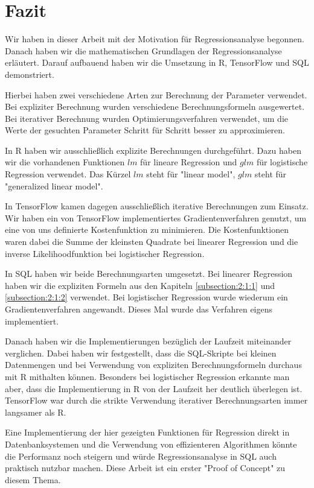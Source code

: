 \chapter{Fazit}
\label{chapter:6}

Wir haben in dieser Arbeit mit der Motivation für Regressionsanalyse begonnen. Danach haben wir die mathematischen Grundlagen der Regressionsanalyse erläutert. Darauf aufbauend haben wir die Umsetzung in R, TensorFlow und SQL demonstriert.

Hierbei haben zwei verschiedene Arten zur Berechnung der Parameter verwendet. Bei expliziter Berechnung wurden verschiedene Berechnungsformeln ausgewertet. Bei iterativer Berechnung wurden Optimierungsverfahren verwendet, um die Werte der gesuchten Parameter Schritt für Schritt besser zu approximieren.

In R haben wir ausschließlich explizite Berechnungen durchgeführt. Dazu haben wir die vorhandenen Funktionen $lm$ für lineare Regression und $glm$ für logistische Regression verwendet. Das Kürzel $lm$ steht für "linear model", $glm$ steht für "generalized linear model".

In TensorFlow kamen dagegen ausschließlich iterative Berechnungen zum Einsatz. Wir haben ein von TensorFlow implementiertes Gradientenverfahren genutzt, um eine von uns definierte Kostenfunktion zu minimieren. Die Kostenfunktionen waren dabei die Summe der kleinsten Quadrate bei linearer Regression und die inverse Likelihoodfunktion bei logistischer Regression.

In SQL haben wir beide Berechnungsarten umgesetzt. Bei linearer Regression haben wir die expliziten Formeln aus den Kapiteln \ref{subsection:2:1:1} und \ref{subsection:2:1:2} verwendet. Bei logistischer Regression wurde wiederum ein Gradientenverfahren angewandt. Dieses Mal wurde das Verfahren eigens implementiert.

Danach haben wir die Implementierungen bezüglich der Laufzeit miteinander verglichen. Dabei haben wir festgestellt, dass die SQL-Skripte bei kleinen Datenmengen und bei Verwendung von expliziten Berechnungsformeln durchaus mit R mithalten können. Besonders bei logistischer Regression erkannte man aber, dass die Implementierung in R von der Laufzeit her deutlich überlegen ist. TensorFlow war durch die strikte Verwendung iterativer Berechnungsarten immer langsamer als R.

Eine Implementierung der hier gezeigten Funktionen für Regression direkt in Datenbanksystemen und die Verwendung von effizienteren Algorithmen könnte die Performanz noch steigern und würde Regressionsanalyse in SQL auch praktisch nutzbar machen. Diese Arbeit ist ein erster "Proof of Concept" zu diesem Thema.
